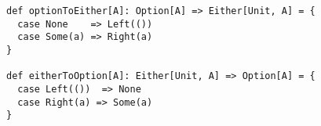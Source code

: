 \begin{algorithm}

\begin{verbatim}
def optionToEither[A]: Option[A] => Either[Unit, A] = {
  case None    => Left(())
  case Some(a) => Right(a)
}

def eitherToOption[A]: Either[Unit, A] => Option[A] = {
  case Left(())  => None
  case Right(a) => Some(a)
}
\end{verbatim}

\caption{ with  as error type is isomorphic to  %
\label{isomorphism}}
\end{algorithm}